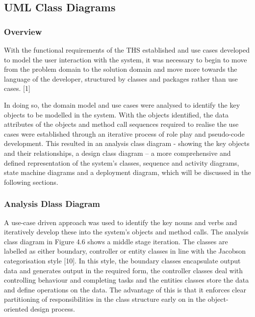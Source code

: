 \documentclass[fontsize=11pt]{extarticle}
\numberwithin{figure}{section} %
\numberwithin{table}{section}%
\begin{document}
\hypertarget{uml-class-diagrams}{%
\subsection{UML Class Diagrams}\label{uml-class-diagrams}}

\hypertarget{overview-2}{%
\subsubsection{Overview}\label{overview-2}}

With the functional requirements of the THS established and use cases
developed to model the user interaction with the system, it was
necessary to begin to move from the problem domain to the solution
domain and move more towards the language of the developer, structured
by classes and packages rather than use cases. {[}1{]}

In doing so, the domain model and use cases were analysed to identify
the key objects to be modelled in the system. With the objects
identified, the data attributes of the objects and method call sequences
required to realise the use cases were established through an iterative
process of role play and pseudo-code development. This resulted in an
analysis class diagram - showing the key objects and their
relationships, a design class diagram -- a more comprehensive and
defined representation of the system's classes, sequence and activity
diagrams, state machine diagrams and a deployment diagram, which will be
discussed in the following sections.

\hypertarget{analysis-dlass-diagram}{%
\subsubsection{Analysis Dlass Diagram}\label{analysis-dlass-diagram}}

A use-case driven approach was used to identify the key nouns and verbs
and iteratively develop these into the system's objects and method
calls. The analysis class diagram in Figure 4.6 shows a middle stage
iteration. The classes are labelled as either boundary, controller or
entity classes in line with the Jacobson categorisation style {[}10{]}.
In this style, the boundary classes encapsulate output data and
generates output in the required form, the controller classes deal with
controlling behaviour and completing tasks and the entities classes
store the data and define operations on the data. The advantage of this
is that it enforces clear partitioning of responsibilities in the class
structure early on in the object-oriented design process.
\end{document}
